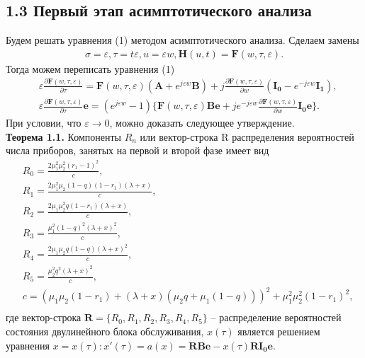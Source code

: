 \subsection{1.3 Первый этап асимптотического анализа}

Будем решать уравнения (1) методом асимптотического анализа.
Сделаем замены
\begin{align}
	\sigma=\varepsilon ,\tau=t\varepsilon, u=\varepsilon w, \boldsymbol{H}(u,t)=\boldsymbol{F}(w,\tau, \varepsilon).
\end{align} 
Тогда можем переписать уравнения (1)
\begin{equation}
	\begin{split}
		&\varepsilon\frac{\partial \boldsymbol{F}(w,\tau,\varepsilon)}{\partial \tau} =\boldsymbol{F}(w,\tau,\varepsilon)(\boldsymbol{A}+e^{j\varepsilon w}\boldsymbol{B})+j\frac{\partial \boldsymbol{F}(w,\tau,\varepsilon)}{\partial w}(\boldsymbol{I_{0}}-e^{-j\varepsilon w}\boldsymbol{I_{1}}),\\
		&\varepsilon\frac{\partial \boldsymbol{F}(w,\tau,\varepsilon)}{\partial \tau}\boldsymbol{e} =(e^{j\varepsilon w}-1)\{\boldsymbol{F}(w,\tau,\varepsilon)\boldsymbol{B}\boldsymbol{e}+j e^{-j\varepsilon w}\frac{\partial \boldsymbol{F}(w,\tau,\varepsilon)}{\partial w}\boldsymbol{I_{0}}\boldsymbol{e}\}.
	\end{split}
\end{equation}
При условии, что $\varepsilon\rightarrow 0$, можно доказать следующее утверждение.\\

\textbf{Теорема 1.1.} Компоненты $R_{n}$ или вектор-строка R распределения вероятностей числа приборов, занятых на первой и второй фазе имеет вид
\begin{equation}
	\begin{split}
		&R_{0} = \frac{2 \mu_{1}^{2} \mu_{2}^{2} (r_{1} - 1)^{2}}{c},\\
		&R_{1} = \frac{2 \mu_{1}^{2} \mu_{2} (1 - q) (1 - r_{1})(\lambda + x)}{c},\\
		&R_{2} = \frac{2 \mu_{1} \mu_{2}^{2} q (1 - r_{1})(\lambda + x)}{c},\\
		&R_{3} = \frac{\mu_{1}^{2} (1 - q)^{2}(\lambda + x)^{2}}{c},\\
		&R_{4} = \frac{2  \mu_{1} \mu_{2} q(1 - q)(\lambda + x)^{2}}{c},\\
		&R_{5} = \frac{ \mu_{2}^{2} q^{2} (\lambda + x)^{2}}{c},\\
		&c =  (\mu_{1} \mu_{2}(1 - r_{1}) + (\lambda + x)(\mu_{2} q + \mu_{1}(1 - q)))^{2} + \mu_{1}^{2} \mu_{2}^{2}(1 - r_{1})^{2},\\
	\end{split}
\end{equation}
где вектор-строка $\boldsymbol{R}=\{R_{0},R_{1},R_{2},R_{3},R_{4},R_{5}\}$ -- распределение вероятностей состояния двулинейного блока обслуживания, $x(\tau)$ является решением уравнения
$x=x(\tau):x'(\tau)=a(x)=\boldsymbol{R}\boldsymbol{B}\boldsymbol{e}-x(\tau)\boldsymbol{R}\boldsymbol{I_{0}}\boldsymbol{e}$.

